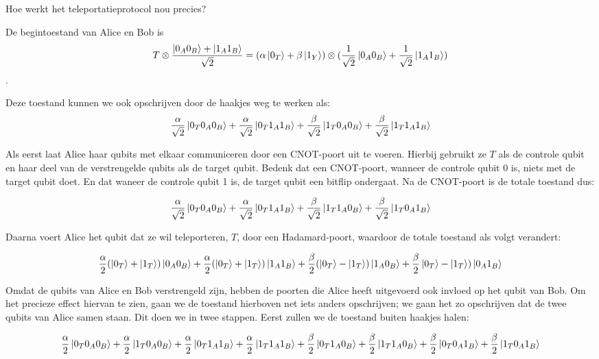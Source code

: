\documentclass[10pt, a4paper]{article}
\begin{document}
\clearpage
Hoe werkt het teleportatieprotocol nou precies?

De begintoestand van Alice en Bob is
\begin{equation}
T \otimes \frac{\ket{0_A0_B}+\ket{1_A1_B}}{\sqrt{2}}
= 
(\alpha\ket{0_T}+\beta\ket{1_Y}) \otimes (\frac{1}{\sqrt{2}}\ket{0_A0_B}+\frac{1}{\sqrt{2}}\ket{1_A1_B})
\end{equation}.

Deze toestand kunnen we ook opschrijven door de haakjes weg te werken als:
\begin{equation}
\frac{\alpha}{\sqrt{2}}\ket{0_T0_A0_B} +
\frac{\alpha}{\sqrt{2}}\ket{0_T1_A1_B} +
\frac{\beta}{\sqrt{2}}\ket{1_T0_A0_B} +
\frac{\beta}{\sqrt{2}}\ket{1_T1_A1_B}
\end{equation}

Als eerst laat Alice haar qubits met elkaar communiceren door een CNOT-poort uit te voeren. Hierbij gebruikt ze $T$ als de controle qubit en haar deel van de verstrengelde qubits als de target qubit. Bedenk dat een CNOT-poort, wanneer de controle qubit 0 is, niets met de target qubit doet. En dat waneer de controle qubit 1 is, de target qubit een bitflip ondergaat. Na de CNOT-poort is de totale toestand dus:

\begin{equation}
\frac{\alpha}{\sqrt{2}}\ket{0_T0_A0_B} +
\frac{\alpha}{\sqrt{2}}\ket{0_T1_A1_B} +
\frac{\beta}{\sqrt{2}}\ket{1_T1_A0_B} +
\frac{\beta}{\sqrt{2}}\ket{1_T0_A1_B}
\end{equation}

Daarna voert Alice het qubit dat ze wil teleporteren, $T$, door een Hadamard-poort, waardoor de totale toestand als volgt verandert:

\begin{equation}
\frac{\alpha}{2}(\ket{0_T}+\ket{1_T})\ket{0_A0_B} +
\frac{\alpha}{2}(\ket{0_T}+\ket{1_T})\ket{1_A1_B} +
\frac{\beta}{2}(\ket{0_T}-\ket{1_T})\ket{1_A0_B} + 
\frac{\beta}{2}\ket{0_T}-\ket{1_T})\ket{0_A1_B}
\end{equation}

Omdat de qubits van Alice en Bob verstrengeld zijn, hebben de poorten die Alice heeft uitgevoerd ook invloed op het qubit van Bob. Om het precieze effect hiervan te zien, gaan we de toestand hierboven net iets anders opschrijven; we gaan het zo opschrijven dat de twee qubits van Alice samen staan. Dit doen we in twee stappen. Eerst zullen we de toestand buiten haakjes halen:

\begin{equation}
\frac{\alpha}{2}\ket{0_T0_A0_B} +
\frac{\alpha}{2}\ket{1_T0_A0_B} +
\frac{\alpha}{2}\ket{0_T1_A1_B} +
\frac{\alpha}{2}\ket{1_T1_A1_B} +
\frac{\beta}{2}\ket{0_T1_A0_B} +
\frac{\beta}{2}\ket{1_T1_A0_B} +
\frac{\beta}{2}\ket{0_T0_A1_B} +
\frac{\beta}{2}\ket{1_T0_A1_B}
\end{equation}
\end{document}

